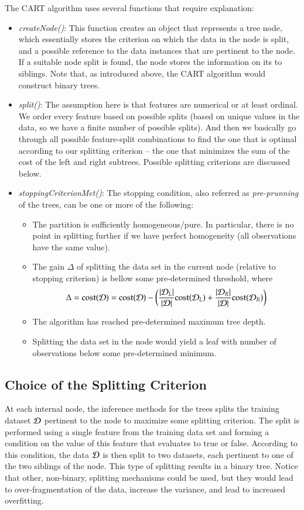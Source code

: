 \begin{refsection}
The CART algorithm uses several functions that require explanation:
\begin{itemize}
\item {\em createNode()}: This function creates an object that represents a tree node, which essentially stores the criterion on which the data in the node is split, and a possible reference to the data instances that are pertinent to the node. If a suitable node split is found, the node stores the information on its to siblings. Note that, as introduced above, the CART algorithm would construct binary trees.
\item {\em split()}: The assumption here is that features are numerical or at least ordinal. We order every feature based on possible splits (based on unique values in the data, so we have a finite number of possible splits). And then we basically go through all possible feature-split combinations to find the one that is optimal according to our splitting criterion -- the one that minimizes the sum of the cost of the left and right subtrees. Possible splitting criterions are discussed below.

\item {\em stoppingCriterionMet()}: The stopping condition, also referred as {\em pre-prunning} of the trees, can be one or more of the following:
\begin{itemize}
\item The partition is sufficiently homogeneous/pure. In particular, there is no point in splitting further if we have perfect homogeneity (all observations have the same value).
\item The gain $\Delta$ of splitting the data set in the current node (relative to stopping criterion) is bellow some pre-determined threshold, where
$$ \Delta = {\rm cost}(\mathcal{D}) = {\rm cost}(\mathcal{D})-\left({|\mathcal{D}_L|\over |\mathcal{D}|}{\rm cost}(\mathcal{D}_L) + {|\mathcal{D}_R|\over |\mathcal{D}|}{\rm cost}(\mathcal{D}_R)\right)$$
\item The algorithm has reached pre-determined maximum tree depth.
\item Splitting the data set in the node would yield a leaf with number of observations below some pre-determined minimum.
\end{itemize}
\end{itemize}


\subsection*{Choice of the Splitting Criterion}

At each internal node, the inference methods for the trees splits the training dataset $\mathcal{D}$ pertinent to the node to maximize some splitting criterion. The split is performed using a single feature from the training data set and forming a condition on the value of this feature that evaluates to true or false. According to this condition, the data $\mathcal{D}$ is then split to two datasets, each pertinent to one of the two siblings of the node. This type of splitting results in a binary tree. Notice that other, non-binary, splitting mechanisms could be used, but they would lead to over-fragmentation of the data, increase the variance, and lead to increased overfitting.


\end{refsection}
